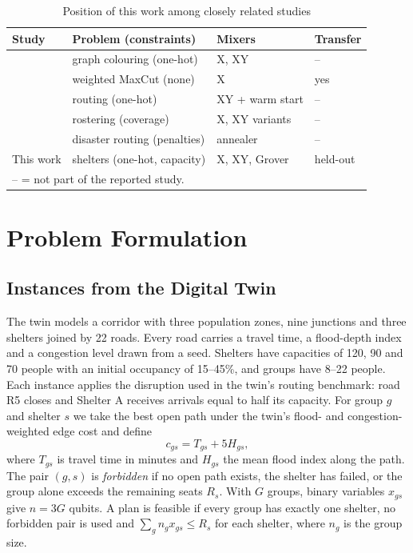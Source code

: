 \documentclass[conference]{IEEEtran}
\begin{document}
\begin{table}[t]
\caption{Position of this work among closely related studies}
\label{tab:pos}
\centering
\footnotesize
\setlength{\tabcolsep}{2.2pt}
\begin{tabular}{llll}
\toprule
Study & Problem (constraints) & Mixers & Transfer\\
\midrule
\cite{WangZ2020} & graph colouring (one-hot) & X, XY & --\\
\cite{Shaydulin2023} & weighted MaxCut (none) & X & yes\\
\cite{doCarmo2025} & routing (one-hot) & XY + warm start & --\\
\cite{Gupta2026} & rostering (coverage) & X, XY variants & --\\
\cite{Cadelina2024} & disaster routing (penalties) & annealer & --\\
This work & shelters (one-hot, capacity) & X, XY, Grover & held-out\\
\bottomrule
\multicolumn{4}{l}{\scriptsize -- = not part of the reported study.}\\
\end{tabular}
\end{table}

\section{Problem Formulation}
\subsection{Instances from the Digital Twin}
The twin models a corridor with three population zones, nine junctions and three shelters joined by 22 roads. Every road carries a travel time, a flood-depth index and a congestion level drawn from a seed. Shelters have capacities of 120, 90 and 70 people with an initial occupancy of 15--45\%, and groups have 8--22 people. Each instance applies the disruption used in the twin's routing benchmark: road R5 closes and Shelter A receives arrivals equal to half its capacity. For group $g$ and shelter $s$ we take the best open path under the twin's flood- and congestion-weighted edge cost and define
\begin{equation}
c_{gs}=T_{gs}+5H_{gs},
\end{equation}
where $T_{gs}$ is travel time in minutes and $H_{gs}$ the mean flood index along the path. The pair $(g,s)$ is \emph{forbidden} if no open path exists, the shelter has failed, or the group alone exceeds the remaining seats $R_s$. With $G$ groups, binary variables $x_{gs}$ give $n=3G$ qubits. A plan is feasible if every group has exactly one shelter, no forbidden pair is used and $\sum_g n_g x_{gs}\le R_s$ for each shelter, where $n_g$ is the group size.
\end{document}
